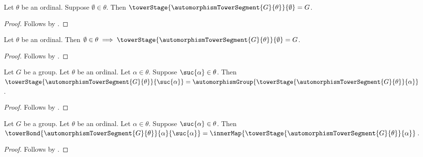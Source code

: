\begin{proposition}\label{automorphism_tower_base}
    Let $\theta$ be an ordinal.
    Suppose $\emptyset\in\theta$.
    Then $\towerStage{\automorphismTowerSegment{G}{\theta}}{\emptyset}=G$.
\end{proposition}
\begin{proof}
    Follows by
        .
\end{proof}

\begin{proposition}\label{automorphism_tower_base_law}
    Let $\theta$ be an ordinal.
    Then $\emptyset\in\theta\implies
        \towerStage{\automorphismTowerSegment{G}{\theta}}{\emptyset}=G$.
\end{proposition}
\begin{proof}
    Follows by .
\end{proof}

\begin{proposition}\label{automorphism_tower_successor_stage}
    Let $G$ be a group.
    Let $\theta$ be an ordinal.
    Let $\alpha\in\theta$.
    Suppose $\suc{\alpha}\in\theta$.
    Then $\towerStage{\automorphismTowerSegment{G}{\theta}}{\suc{\alpha}}=
        \automorphismGroup{
            \towerStage{\automorphismTowerSegment{G}{\theta}}{\alpha}}$.
\end{proposition}
\begin{proof}
    Follows by
        .
\end{proof}

\begin{proposition}\label{automorphism_tower_successor_bond}
    Let $G$ be a group.
    Let $\theta$ be an ordinal.
    Let $\alpha\in\theta$.
    Suppose $\suc{\alpha}\in\theta$.
    Then $\towerBond{\automorphismTowerSegment{G}{\theta}}
            {\alpha}{\suc{\alpha}}=
        \innerMap{\towerStage{
            \automorphismTowerSegment{G}{\theta}}{\alpha}}$.
\end{proposition}
\begin{proof}
    Follows by
        .
\end{proof}

